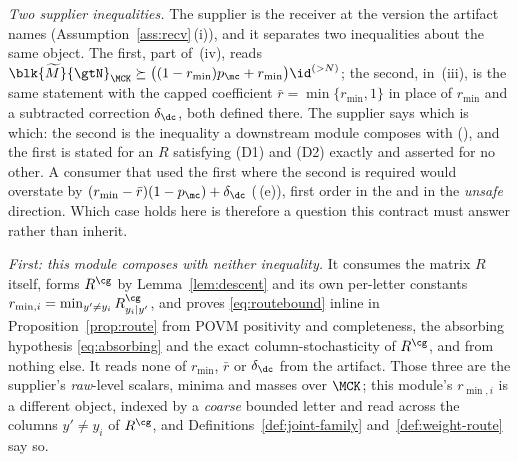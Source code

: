 \begin{remark}\label{rem:darkcompose}
\emph{Two supplier inequalities.} The supplier is the receiver at the version
the artifact names (Assumption~\ref{ass:recv}\,(i)), and it separates two
inequalities about the same object. The first, part of
\,(iv), reads
$\blk{\widetilde M}{\gtN}_{\MCK}\succeq
\big((1-r_{\min})p_{\mc}+r_{\min}\big)\id^{(>N)}$; the second, in
\,(iii), is the
same statement with the capped coefficient $\bar r=\min\{r_{\min},1\}$ in
place of $r_{\min}$ and a subtracted correction $\delta_{\dc}$, both defined
there. The supplier says which is which: the second is the inequality a
downstream module composes with
(), and the
first is stated for an $R$ satisfying (D1) and (D2) exactly and asserted for
no other. A consumer that used the first where the second is required would
overstate by $(r_{\min}-\bar r)(1-p_{\mc})+\delta_{\dc}$
(\,(e)), first order in the
 and in the \emph{unsafe} direction. Which case
holds here is therefore a question this contract must answer rather than
inherit.

\emph{First: this module composes with neither inequality.} It consumes the
matrix $R$ itself, forms $R^{\cg}$ by Lemma~\ref{lem:descent} and its own
per-letter constants $r_{\min,i}=\min_{y'\ne y_i}R^{\cg}_{y_i|y'}$, and proves
\eqref{eq:routebound} inline in Proposition~\ref{prop:route} from POVM
positivity and completeness, the absorbing hypothesis \eqref{eq:absorbing} and
the exact column-stochasticity of $R^{\cg}$, and from nothing else. It reads
none of $r_{\min}$, $\bar r$ or $\delta_{\dc}$ from the artifact. Those three
are the supplier's \emph{raw}-level scalars, minima and masses over $\MCK$;
this module's $r_{\min,i}$ is a different object, indexed by a \emph{coarse}
bounded letter and read across the columns $y'\ne y_i$ of $R^{\cg}$, and
Definitions~\ref{def:joint-family} and~\ref{def:weight-route} say so.


\end{remark}
